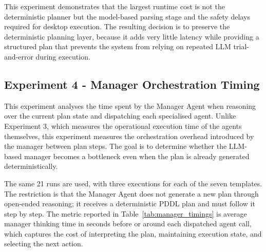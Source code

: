 This experiment demonstrates that the largest runtime cost is not the deterministic planner but the model-based parsing stage and the safety delays required for desktop execution. The resulting decision is to preserve the deterministic planning layer, because it adds very little latency while providing a structured plan that prevents the system from relying on repeated LLM trial-and-error during execution.

\subsection{Experiment 4 - Manager Orchestration Timing}
\label{sec:manager_orchestration_timing}
This experiment analyses the time spent by the Manager Agent when reasoning over the current plan state and dispatching each specialised agent. Unlike Experiment 3, which measures the operational execution time of the agents themselves, this experiment measures the orchestration overhead introduced by the manager between plan steps. The goal is to determine whether the LLM-based manager becomes a bottleneck even when the plan is already generated deterministically.

The same 21 runs are used, with three executions for each of the seven templates. The restriction is that the Manager Agent does not generate a new plan through open-ended reasoning; it receives a deterministic PDDL plan and must follow it step by step. The metric reported in Table~\ref{tab:manager_timings} is average manager thinking time in seconds before or around each dispatched agent call, which captures the cost of interpreting the plan, maintaining execution state, and selecting the next action.

